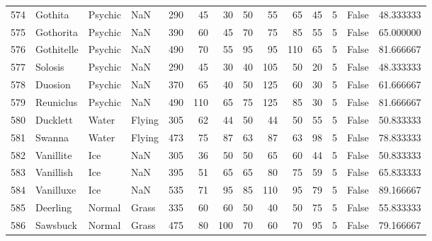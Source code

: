 \begin{tabular}{rlllrrrrrrrrlr}
 574 &                    Gothita &   Psychic &       NaN &    290 &   45 &      30 &       50 &       55 &       65 &     45 &           5 &      False &   48.333333 \\
 575 &                  Gothorita &   Psychic &       NaN &    390 &   60 &      45 &       70 &       75 &       85 &     55 &           5 &      False &   65.000000 \\
 576 &                 Gothitelle &   Psychic &       NaN &    490 &   70 &      55 &       95 &       95 &      110 &     65 &           5 &      False &   81.666667 \\
 577 &                    Solosis &   Psychic &       NaN &    290 &   45 &      30 &       40 &      105 &       50 &     20 &           5 &      False &   48.333333 \\
 578 &                    Duosion &   Psychic &       NaN &    370 &   65 &      40 &       50 &      125 &       60 &     30 &           5 &      False &   61.666667 \\
 579 &                  Reuniclus &   Psychic &       NaN &    490 &  110 &      65 &       75 &      125 &       85 &     30 &           5 &      False &   81.666667 \\
 580 &                   Ducklett &     Water &    Flying &    305 &   62 &      44 &       50 &       44 &       50 &     55 &           5 &      False &   50.833333 \\
 581 &                     Swanna &     Water &    Flying &    473 &   75 &      87 &       63 &       87 &       63 &     98 &           5 &      False &   78.833333 \\
 582 &                  Vanillite &       Ice &       NaN &    305 &   36 &      50 &       50 &       65 &       60 &     44 &           5 &      False &   50.833333 \\
 583 &                  Vanillish &       Ice &       NaN &    395 &   51 &      65 &       65 &       80 &       75 &     59 &           5 &      False &   65.833333 \\
 584 &                  Vanilluxe &       Ice &       NaN &    535 &   71 &      95 &       85 &      110 &       95 &     79 &           5 &      False &   89.166667 \\
 585 &                   Deerling &    Normal &     Grass &    335 &   60 &      60 &       50 &       40 &       50 &     75 &           5 &      False &   55.833333 \\
 586 &                   Sawsbuck &    Normal &     Grass &    475 &   80 &     100 &       70 &       60 &       70 &     95 &           5 &      False &   79.166667 \\

\end{tabular}
